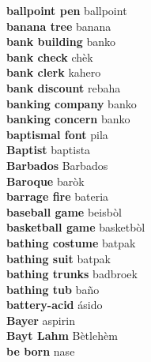 \textbf{ ballpoint pen  } ballpoint \\
\textbf{ banana tree  } banana \\
\textbf{ bank building  } banko \\
\textbf{ bank check  } chèk \\
\textbf{ bank clerk  } kahero \\
\textbf{ bank discount  } rebaha \\
\textbf{ banking company  } banko \\
\textbf{ banking concern  } banko \\
\textbf{ baptismal font  } pila \\
\textbf{ Baptist  } baptista \\
\textbf{ Barbados  } Barbados \\
\textbf{ Baroque  } baròk \\
\textbf{ barrage fire  } bateria \\
\textbf{ baseball game  } beisbòl \\
\textbf{ basketball game  } basketbòl \\
\textbf{ bathing costume  } batpak \\
\textbf{ bathing suit  } batpak \\
\textbf{ bathing trunks  } badbroek \\
\textbf{ bathing tub  } baño \\
\textbf{ battery-acid  } ásido \\
\textbf{ Bayer  } aspirin \\
\textbf{ Bayt Lahm  } Bètlehèm \\
\textbf{ be born  } nase \\
